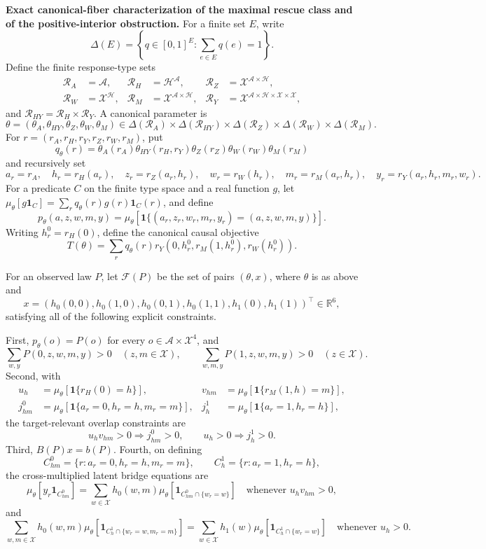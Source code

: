 \textbf{Exact canonical-fiber characterization of the maximal rescue class and of the positive-interior obstruction.}
For a finite set \(E\), write
\[
 \Delta(E)=\left\{q\in[0,1]^E:\sum_{e\in E}q(e)=1\right\}.
\]
Define the finite response-type sets
\[
\begin{aligned}
 \mathcal R_A&=\mathcal A,&
 \mathcal R_H&=\mathcal H^{\mathcal A},&
 \mathcal R_Z&=\mathcal X^{\mathcal A\times\mathcal H},\\
 \mathcal R_W&=\mathcal X^{\mathcal H},&
 \mathcal R_M&=\mathcal X^{\mathcal A\times\mathcal H},&
 \mathcal R_Y&=\mathcal X^{\mathcal A\times\mathcal H\times\mathcal X\times\mathcal X},
\end{aligned}
\]
and \(\mathcal R_{HY}=\mathcal R_H\times\mathcal R_Y\).  A canonical parameter is
\[
 \theta=(\theta_A,\theta_{HY},\theta_Z,\theta_W,\theta_M)
 \in\Delta(\mathcal R_A)\times\Delta(\mathcal R_{HY})
 \times\Delta(\mathcal R_Z)\times\Delta(\mathcal R_W)
 \times\Delta(\mathcal R_M).
\]
For \(r=(r_A,r_H,r_Y,r_Z,r_W,r_M)\), put
\[
 q_\theta(r)=\theta_A(r_A)\theta_{HY}(r_H,r_Y)
 \theta_Z(r_Z)\theta_W(r_W)\theta_M(r_M)
\]
and recursively set
\[
 a_r=r_A,\quad h_r=r_H(a_r),\quad z_r=r_Z(a_r,h_r),\quad
 w_r=r_W(h_r),\quad m_r=r_M(a_r,h_r),\quad
 y_r=r_Y(a_r,h_r,m_r,w_r).
\]
For a predicate \(C\) on the finite type space and a real function \(g\), let
\(\mu_\theta[g\mathbf 1_C]=\sum_rq_\theta(r)g(r)\mathbf 1_C(r)\), and define
\[
 p_\theta(a,z,w,m,y)=
 \mu_\theta[\mathbf 1\{(a_r,z_r,w_r,m_r,y_r)=(a,z,w,m,y)\}].
\]
Writing \(h_r^0=r_H(0)\), define the canonical causal objective
\[
 T(\theta)=\sum_rq_\theta(r)
 r_Y\!\left(0,h_r^0,r_M(1,h_r^0),r_W(h_r^0)\right).
 \tag{12}
\]

For an observed law \(P\), let \(\mathcal F(P)\) be the set of pairs
\((\theta,x)\), where \(\theta\) is as above and
\[
 x=(h_0(0,0),h_0(1,0),h_0(0,1),h_0(1,1),h_1(0),h_1(1))^\top\in\mathbb R^6,
\]
satisfying all of the following explicit constraints.

First, \(p_\theta(o)=P(o)\) for every
\(o\in\mathcal A\times\mathcal X^4\), and
\[
 \sum_{w,y}P(0,z,w,m,y)>0\quad(z,m\in\mathcal X),
 \qquad
 \sum_{w,m,y}P(1,z,w,m,y)>0\quad(z\in\mathcal X).
 \tag{13}
\]
Second, with
\[
\begin{aligned}
 u_h&=\mu_\theta[\mathbf 1\{r_H(0)=h\}],&
 v_{hm}&=\mu_\theta[\mathbf 1\{r_M(1,h)=m\}],\\
 j^0_{hm}&=\mu_\theta[\mathbf 1\{a_r=0,h_r=h,m_r=m\}],&
 j^1_h&=\mu_\theta[\mathbf 1\{a_r=1,h_r=h\}],
\end{aligned}
\]
the target-relevant overlap constraints are
\[
 u_hv_{hm}>0\Longrightarrow j^0_{hm}>0,
 \qquad
 u_h>0\Longrightarrow j^1_h>0.
 \tag{14}
\]
Third, \(B(P)x=b(P)\).  Fourth, on defining
\[
 C^0_{hm}=\{r:a_r=0,h_r=h,m_r=m\},
 \qquad C^1_h=\{r:a_r=1,h_r=h\},
\]
the cross-multiplied latent bridge equations are
\[
 \mu_\theta[y_r\mathbf 1_{C^0_{hm}}]
 =\sum_{w\in\mathcal X}h_0(w,m)
   \mu_\theta[\mathbf 1_{C^0_{hm}\cap\{w_r=w\}}]
 \quad\text{whenever }u_hv_{hm}>0,
 \tag{15}
\]
and
\[
 \sum_{w,m\in\mathcal X}h_0(w,m)
   \mu_\theta[\mathbf 1_{C^1_h\cap\{w_r=w,m_r=m\}}]
 =\sum_{w\in\mathcal X}h_1(w)
   \mu_\theta[\mathbf 1_{C^1_h\cap\{w_r=w\}}]
 \quad\text{whenever }u_h>0.
 \tag{16}
\]

